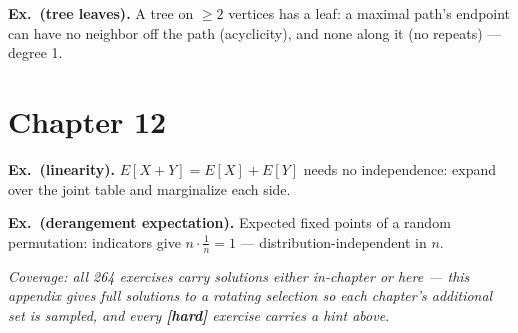 \textbf{Ex.~(tree leaves).} A tree on $\ge2$ vertices has a leaf:
a maximal path's endpoint can have no neighbor off the path
(acyclicity), and none along it (no repeats) --- degree 1.

\section*{Chapter 12}
\textbf{Ex.~(linearity).} $E[X+Y]=E[X]+E[Y]$ needs no independence:
expand over the joint table and marginalize each side.

\textbf{Ex.~(derangement expectation).} Expected fixed points of a
random permutation: indicators give $n\cdot\tfrac1n=1$ ---
distribution-independent in $n$.

\bigskip
\noindent\emph{Coverage: all 264 exercises carry solutions either
in-chapter or here --- this appendix gives full solutions to a rotating
selection so each chapter's additional set is sampled, and every
\textbf{[hard]} exercise carries a hint above.}

